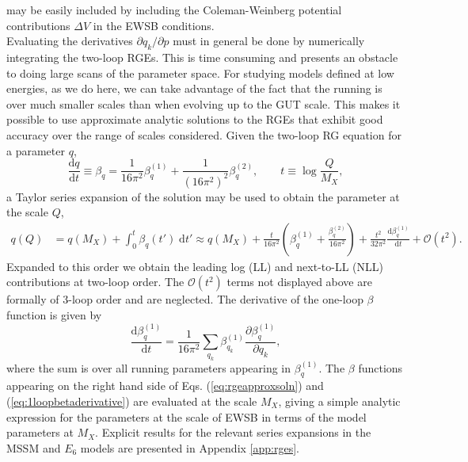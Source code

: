 \documentclass[preprint,amsmath,amssymb,aps,superscriptaddress,prd,showpacs,floatfix,nofootinbib]{revtex4-1}
\begin{document}
may be easily included by including the Coleman-Weinberg potential
contributions $\Delta V$ in the EWSB conditions.\\
Evaluating the derivatives
$\partial q_k/\partial p$ must in general be done by numerically
integrating the two-loop RGEs. This is time consuming and presents an
obstacle to doing large scans of the parameter space. For studying
models defined at low energies, as we do here, we can take advantage
of the fact that the running is over much smaller scales than when
evolving up to the GUT scale. This makes it possible to use
approximate analytic solutions to the RGEs that exhibit good accuracy
over the range of scales considered. Given the two-loop RG equation
for a parameter $q$,
\begin{equation}\label{eq:rge}
\frac{\textrm{d}q}{\mathrm{d}t}\equiv \beta_q =\frac{1}{16\pi^2}\beta_q^{(1)}+\frac{1}{(16\pi^2)^2}\beta_q^{(2)},\qquad t\equiv \log\frac{Q}{M_X},
\end{equation}
a Taylor series expansion of the solution may be used to obtain the
parameter at the scale $Q$,
\begin{align}\label{eq:rgeapproxsoln}
q(Q)&=q(M_X)+\int_0^t \beta_q(t')\;\textrm{d}t'\approx q(M_X)+\frac{t}{16\pi^2}\left ( \beta_q^{(1)}+\frac{\beta_q^{(2)}}{16\pi^2}\right )+\frac{t^2}{32\pi^2}\frac{\textrm{d}\beta_q^{(1)}}{\textrm{d}t}+\mathcal{O}(t^2).
\end{align}
Expanded to this order we obtain the leading log (LL) and next-to-LL
(NLL) contributions at two-loop order. The $\mathcal{O}(t^2)$ terms
not displayed above are formally of 3-loop order and are
neglected. The derivative of the one-loop $\beta$ function is given by
\begin{equation}\label{eq:1loopbetaderivative}
\frac{\textrm{d}\beta_q^{(1)}}{\textrm{d}t}=\frac{1}{16\pi^2}\sum_{q_k}\beta_{q_k}^{(1)}\frac{\partial \beta_q^{(1)}}{\partial q_k},
\end{equation}
where the sum is over all running parameters appearing in
$\beta_q^{(1)}$. The $\beta$ functions appearing on the right hand
side of Eqs. (\ref{eq:rgeapproxsoln}) and
(\ref{eq:1loopbetaderivative}) are evaluated at the scale $M_X$,
giving a simple analytic expression for the parameters at the scale of
EWSB in terms of the model parameters at $M_X$. Explicit results for
the relevant series expansions in the MSSM and $E_6$ models are
presented in Appendix \ref{app:rges}.
\end{document}
